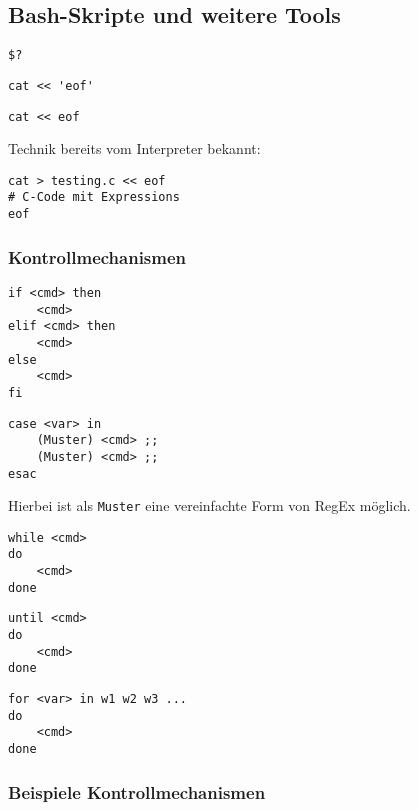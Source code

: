	\subsection{Bash-Skripte und weitere Tools} %
	\label{sub:bash_skripte_und_weitere_tools}

		\begin{lstlisting}
$?
		\end{lstlisting}
		\begin{lstlisting}
cat << 'eof'
		\end{lstlisting}
		\begin{lstlisting}
cat << eof
		\end{lstlisting}
		Technik bereits vom Interpreter bekannt:
		\lstBash
		\begin{lstlisting}
cat > testing.c << eof
# C-Code mit Expressions
eof
		\end{lstlisting}

		\subsubsection*{Kontrollmechanismen} %
		\label{ssub:kontrollmechanismen}
		
			\begin{lstlisting}
if <cmd> then
	<cmd>
elif <cmd> then
	<cmd>
else
	<cmd>
fi
			\end{lstlisting}
			\begin{lstlisting}
case <var> in
	(Muster) <cmd> ;;
	(Muster) <cmd> ;;
esac
			\end{lstlisting}
			Hierbei ist als \texttt{Muster} eine vereinfachte Form von RegEx möglich.
			\begin{lstlisting}
while <cmd>
do
	<cmd>
done
			\end{lstlisting}
			\begin{lstlisting}
until <cmd>
do
	<cmd>
done
			\end{lstlisting}
			\begin{lstlisting}
for <var> in w1 w2 w3 ...
do
	<cmd>
done
			\end{lstlisting}

		\subsubsection*{Beispiele Kontrollmechanismen} %
		\label{ssub:beispiele_kontrollmechanismen}

